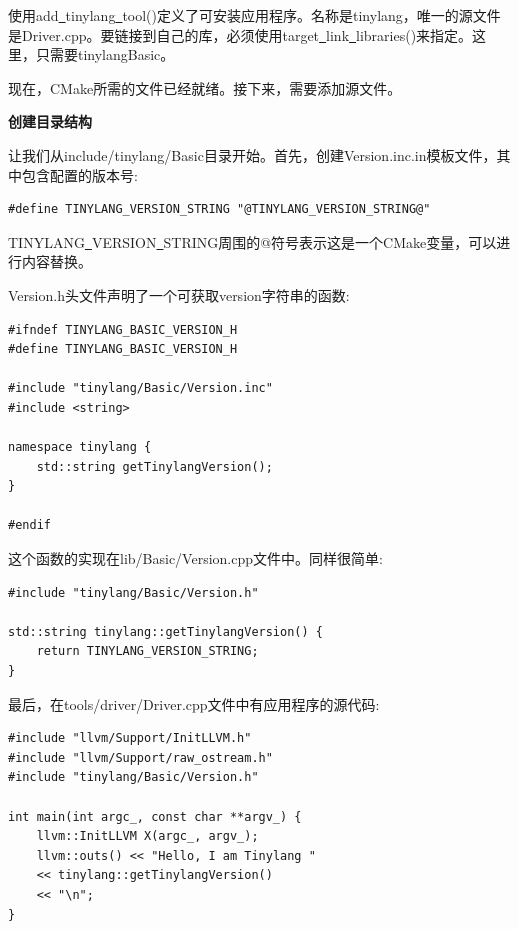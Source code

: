 使用add\underline{~}tinylang\underline{~}tool()定义了可安装应用程序。名称是tinylang，唯一的源文件是Driver.cpp。要链接到自己的库，必须使用target\underline{~}link\underline{~}libraries()来指定。这里，只需要tinylangBasic。\par

现在，CMake所需的文件已经就绪。接下来，需要添加源文件。\par

\hspace*{\fill} \par %
\textbf{创建目录结构}

让我们从include/tinylang/Basic目录开始。首先，创建Version.inc.in模板文件，其中包含配置的版本号:\par

\begin{lstlisting}[caption={}]
#define TINYLANG_VERSION_STRING "@TINYLANG_VERSION_STRING@"
\end{lstlisting}

TINYLANG\underline{~}VERSION\underline{~}STRING周围的@符号表示这是一个CMake变量，可以进行内容替换。\par

Version.h头文件声明了一个可获取version字符串的函数:\par

\begin{lstlisting}[caption={}]
#ifndef TINYLANG_BASIC_VERSION_H
#define TINYLANG_BASIC_VERSION_H

#include "tinylang/Basic/Version.inc"
#include <string>

namespace tinylang {
	std::string getTinylangVersion();
}

#endif
\end{lstlisting}

这个函数的实现在lib/Basic/Version.cpp文件中。同样很简单:\par

\begin{lstlisting}[caption={}]
#include "tinylang/Basic/Version.h"

std::string tinylang::getTinylangVersion() {
	return TINYLANG_VERSION_STRING;
}
\end{lstlisting}

最后，在tools/driver/Driver.cpp文件中有应用程序的源代码:\par

\begin{lstlisting}[caption={}]
#include "llvm/Support/InitLLVM.h"
#include "llvm/Support/raw_ostream.h"
#include "tinylang/Basic/Version.h"

int main(int argc_, const char **argv_) {
	llvm::InitLLVM X(argc_, argv_);
	llvm::outs() << "Hello, I am Tinylang "
	<< tinylang::getTinylangVersion()
	<< "\n";
}
\end{lstlisting}

